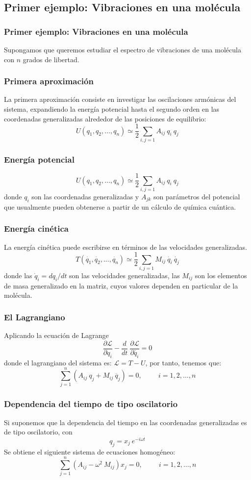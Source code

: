 \subsection{Primer ejemplo: Vibraciones en una molécula}
\begin{frame}
\frametitle{Primer ejemplo: Vibraciones en una molécula}
Supongamos que queremos estudiar el espectro de vibraciones de una molécula con $n$ grados de libertad.
\end{frame}
\begin{frame}
\frametitle{Primera aproximación}
La primera aproximación consiste en investigar las oscilaciones armónicas del sistema, expandiendo la energía potencial hasta el segundo orden en las coordenadas generalizadas alrededor de las posiciones de equilibrio:
\pause
\[ U(q_{1}, q_{2}, \ldots, q_{n}) \simeq \dfrac{1}{2} \sum_{i, j = 1} A_{ij} \: q_{i} \: q_{j}\]
\end{frame}
\begin{frame}
\frametitle{Energía potencial}
\[ U(q_{1}, q_{2}, \ldots, q_{n}) \simeq \dfrac{1}{2} \sum_{i,j=1} A_{ij} \: q_{i} \: q_{j}\]
donde $q_{i}$ son las coordenadas generalizadas y $A_{jk}$ son parámetros del potencial que usualmente pueden obtenerse a partir de un cálculo de química cuántica.
\end{frame}
\begin{frame}
\frametitle{Energía cinética}
La energía cinética puede escribirse en términos de las velocidades generalizadas.
\[ T(\dot{q_{1}}, \dot{q_{2}}, \ldots, \dot{q_{n}}) \simeq \dfrac{1}{2} \sum_{i, j=1} M_{ij} \: \dot{q_{i}} \: \dot{q_{j}} \]
donde las $\dot{q}_{i}= dq_{i}/dt$ son las velocidades generalizadas, las $M_{ij}$ son los elementos de masa generalizado en la matriz, cuyos valores dependen en particular de la molécula. 
\end{frame}
\begin{frame}
\frametitle{El Lagrangiano}
Aplicando la ecuación de Lagrange
\[ \dfrac{\partial \mathcal{L}}{\partial q_i} - \dfrac{d}{dt} \: \dfrac{\partial \mathcal{L}}{\partial \dot{q_{i}}} = 0 \]
donde el lagrangiano del sistema es: $\mathcal{L} = T - U$, por tanto, tenemos que:
\[ \sum_{j = 1}^{n} \left( A_{ij} \: q_{j} + M_{ij} \: \ddot{q_{j}} \right) = 0, \hspace{1cm} i = 1, 2, \ldots, n \]
\end{frame}
\begin{frame}
\frametitle{Dependencia del tiempo de tipo oscilatorio }
Si suponemos que la dependencia del tiempo en las coordenadas generalizadas es de tipo oscilatorio, con
\[ q_{j} = x_{j} \: e^{-i \omega t} \]
Se obtiene el siguiente sistema de ecuaciones homogéneo:
\[ \sum_{j = 1}^{n} \left( A_{ij} -  \omega^{2} \: M_{ij} \right) x_{j} = 0, \hspace{1cm} i = 1, 2, \ldots, n \]
\end{frame}
